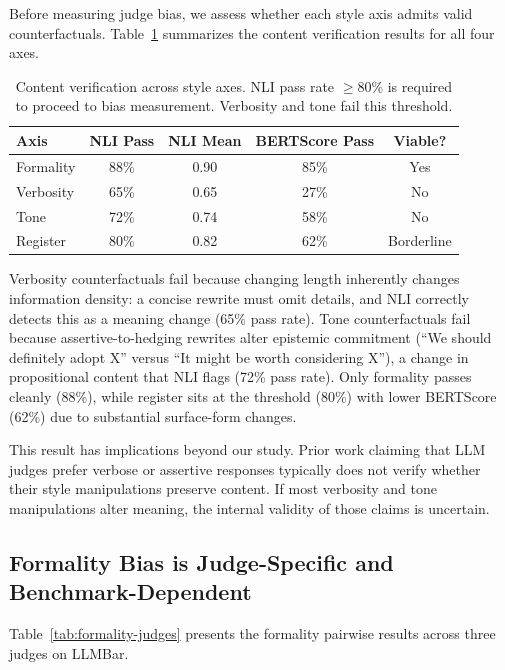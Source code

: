 \documentclass[11pt,a4paper]{article}
\begin{document}
Before measuring judge bias, we assess whether each style axis admits valid counterfactuals.
Table~\ref{tab:axis-feasibility} summarizes the content verification results for all four axes.

\begin{table}[t]
\centering
\caption{Content verification across style axes. NLI pass rate $\geq$80\% is required to proceed to bias measurement. Verbosity and tone fail this threshold.}
\label{tab:axis-feasibility}
\small
\begin{tabular}{lcccc}
\toprule
\textbf{Axis} & \textbf{NLI Pass} & \textbf{NLI Mean} & \textbf{BERTScore Pass} & \textbf{Viable?} \\
\midrule
Formality & 88\% & 0.90 & 85\% & Yes \\
Verbosity & 65\% & 0.65 & 27\% & No \\
Tone & 72\% & 0.74 & 58\% & No \\
Register & 80\% & 0.82 & 62\% & Borderline \\
\bottomrule
\end{tabular}
\end{table}

Verbosity counterfactuals fail because changing length inherently changes information density: a concise rewrite must omit details, and NLI correctly detects this as a meaning change (65\% pass rate).
Tone counterfactuals fail because assertive-to-hedging rewrites alter epistemic commitment (``We should definitely adopt X'' versus ``It might be worth considering X''), a change in propositional content that NLI flags (72\% pass rate).
Only formality passes cleanly (88\%), while register sits at the threshold (80\%) with lower BERTScore (62\%) due to substantial surface-form changes.

This result has implications beyond our study.
Prior work claiming that LLM judges prefer verbose or assertive responses \citep{sosbench2025,casse2026} typically does not verify whether their style manipulations preserve content.
If most verbosity and tone manipulations alter meaning, the internal validity of those claims is uncertain.

\subsection{Formality Bias is Judge-Specific and Benchmark-Dependent}
\label{sec:formality}

Table~\ref{tab:formality-judges} presents the formality pairwise results across three judges on LLMBar.
\end{document}
